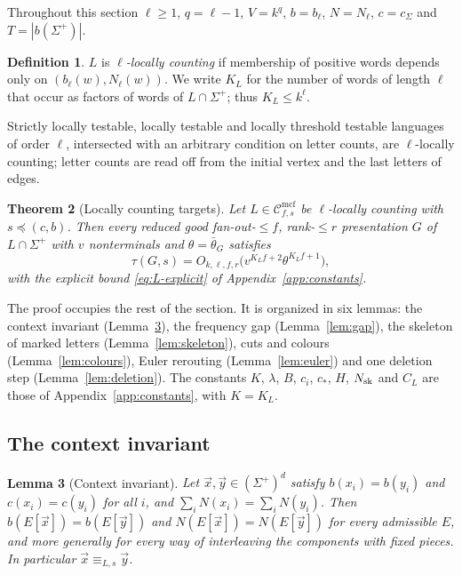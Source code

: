 \documentclass[11pt]{article}
\numberwithin{equation}{section}
\theoremstyle{plain}
\newtheorem{theorem}{Theorem}[section]
\newtheorem{lemma}[theorem]{Lemma}
\theoremstyle{definition}
\newtheorem{definition}[theorem]{Definition}
\theoremstyle{remark}
\theoremstyle{plain}
\newcommand{\Cmcf}[2]{\mathcal{C}^{\mathrm{mcf}}_{#1,#2}}
\newcommand{\tuple}[1]{\vec{#1}}
\newcommand{\bth}{\bar\theta}
\newcommand{\Kocc}{K_L}
\begin{document}
Throughout this section $\ell\ge1$, $q=\ell-1$, $V=k^q$, $b=b_\ell$, $N=N_\ell$,
$c=c_\Sigma$ and $T=|b(\Sigma^+)|$.

\begin{definition}
$L$ is \emph{$\ell$-locally counting} if membership of positive words depends
only on $(b_\ell(w),N_\ell(w))$.  We write $\Kocc$ for the number of words of
length $\ell$ that occur as factors of words of $L\cap\Sigma^+$; thus
$\Kocc\le k^\ell$.
\end{definition}

Strictly locally testable, locally testable and locally threshold testable
languages of order $\ell$, intersected with an arbitrary condition on letter
counts, are $\ell$-locally counting; letter counts are read off from the
initial vertex and the last letters of edges.

\begin{theorem}[Locally counting targets]
\label{thm:L}
Let $L\in\Cmcf{f}{s}$ be $\ell$-locally counting with $s\preceq(c,b)$.  Then
every reduced good fan-out-$\le f$, rank-$\le r$ presentation $G$ of
$L\cap\Sigma^+$ with $v$ nonterminals and $\theta=\bth_G$ satisfies
\[
 \tau(G,s)=O_{k,\ell,f,r}\bigl(v^{\Kocc f+2}\theta^{\Kocc f+1}\bigr),
\]
with the explicit bound \eqref{eq:L-explicit} of Appendix~\ref{app:constants}.
\end{theorem}

The proof occupies the rest of the section.  It is organized in six lemmas:
the context invariant (Lemma~\ref{lem:context}), the frequency gap
(Lemma~\ref{lem:gap}), the skeleton of marked letters (Lemma~\ref{lem:skeleton}),
cuts and colours (Lemma~\ref{lem:colours}), Euler rerouting
(Lemma~\ref{lem:euler}) and one deletion step (Lemma~\ref{lem:deletion}).  The
constants $K$, $\lambda$, $B$, $c_i$, $c_*$, $H$, $N_{\rm sk}$ and $C_L$ are
those of Appendix~\ref{app:constants}, with $K=\Kocc$.

\subsection{The context invariant}

\begin{lemma}[Context invariant]
\label{lem:context}
Let $\tuple x,\tuple y\in(\Sigma^+)^d$ satisfy $b(x_i)=b(y_i)$ and
$c(x_i)=c(y_i)$ for all $i$, and $\sum_iN(x_i)=\sum_iN(y_i)$.  Then
$b(E[\tuple x])=b(E[\tuple y])$ and $N(E[\tuple x])=N(E[\tuple y])$ for every
admissible $E$, and more generally for every way of interleaving the
components with fixed pieces.  In particular $\tuple x\equiv_{L,s}\tuple y$.
\end{lemma}
\end{document}
